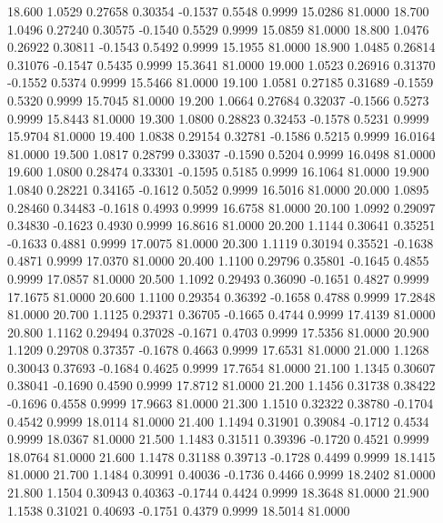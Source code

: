   18.600   1.0529   0.27658   0.30354  -0.1537   0.5548   0.9999  15.0286  81.0000
  18.700   1.0496   0.27240   0.30575  -0.1540   0.5529   0.9999  15.0859  81.0000
  18.800   1.0476   0.26922   0.30811  -0.1543   0.5492   0.9999  15.1955  81.0000
  18.900   1.0485   0.26814   0.31076  -0.1547   0.5435   0.9999  15.3641  81.0000
  19.000   1.0523   0.26916   0.31370  -0.1552   0.5374   0.9999  15.5466  81.0000
  19.100   1.0581   0.27185   0.31689  -0.1559   0.5320   0.9999  15.7045  81.0000
  19.200   1.0664   0.27684   0.32037  -0.1566   0.5273   0.9999  15.8443  81.0000
  19.300   1.0800   0.28823   0.32453  -0.1578   0.5231   0.9999  15.9704  81.0000
  19.400   1.0838   0.29154   0.32781  -0.1586   0.5215   0.9999  16.0164  81.0000
  19.500   1.0817   0.28799   0.33037  -0.1590   0.5204   0.9999  16.0498  81.0000
  19.600   1.0800   0.28474   0.33301  -0.1595   0.5185   0.9999  16.1064  81.0000
  19.900   1.0840   0.28221   0.34165  -0.1612   0.5052   0.9999  16.5016  81.0000
  20.000   1.0895   0.28460   0.34483  -0.1618   0.4993   0.9999  16.6758  81.0000
  20.100   1.0992   0.29097   0.34830  -0.1623   0.4930   0.9999  16.8616  81.0000
  20.200   1.1144   0.30641   0.35251  -0.1633   0.4881   0.9999  17.0075  81.0000
  20.300   1.1119   0.30194   0.35521  -0.1638   0.4871   0.9999  17.0370  81.0000
  20.400   1.1100   0.29796   0.35801  -0.1645   0.4855   0.9999  17.0857  81.0000
  20.500   1.1092   0.29493   0.36090  -0.1651   0.4827   0.9999  17.1675  81.0000
  20.600   1.1100   0.29354   0.36392  -0.1658   0.4788   0.9999  17.2848  81.0000
  20.700   1.1125   0.29371   0.36705  -0.1665   0.4744   0.9999  17.4139  81.0000
  20.800   1.1162   0.29494   0.37028  -0.1671   0.4703   0.9999  17.5356  81.0000
  20.900   1.1209   0.29708   0.37357  -0.1678   0.4663   0.9999  17.6531  81.0000
  21.000   1.1268   0.30043   0.37693  -0.1684   0.4625   0.9999  17.7654  81.0000
  21.100   1.1345   0.30607   0.38041  -0.1690   0.4590   0.9999  17.8712  81.0000
  21.200   1.1456   0.31738   0.38422  -0.1696   0.4558   0.9999  17.9663  81.0000
  21.300   1.1510   0.32322   0.38780  -0.1704   0.4542   0.9999  18.0114  81.0000
  21.400   1.1494   0.31901   0.39084  -0.1712   0.4534   0.9999  18.0367  81.0000
  21.500   1.1483   0.31511   0.39396  -0.1720   0.4521   0.9999  18.0764  81.0000
  21.600   1.1478   0.31188   0.39713  -0.1728   0.4499   0.9999  18.1415  81.0000
  21.700   1.1484   0.30991   0.40036  -0.1736   0.4466   0.9999  18.2402  81.0000
  21.800   1.1504   0.30943   0.40363  -0.1744   0.4424   0.9999  18.3648  81.0000
  21.900   1.1538   0.31021   0.40693  -0.1751   0.4379   0.9999  18.5014  81.0000
